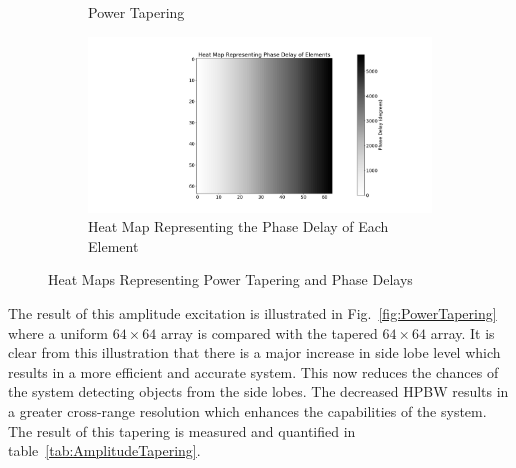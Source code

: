 \documentclass[11pt]{witseiepaper}
\begin{document}
\begin{bibunit}[witseie]
\begin{figure}[htb]
\begin{subfigure}{.5\textwidth}
            \caption{Power Tapering}
            \label{fig:PowerTaperingHeatMap}
        \end{subfigure}%
        \begin{subfigure}{.5\textwidth}
            \centering
            \includegraphics[width=0.9\linewidth]{PhasingHeatMap.pdf}
            \caption{Heat Map Representing the Phase Delay of Each Element}
                \label{fig:PhasingHeatMap}
            \end{subfigure}
\caption{Heat Maps Representing Power Tapering and Phase Delays}
\label{fig:HeatMaps}
\end{figure}
The result of this amplitude excitation is illustrated in Fig.~\ref{fig:PowerTapering} where a uniform $64 \times 64$ array is compared with the tapered $64 \times 64$ array. It is clear from this illustration that there is a major increase in side lobe level which results in a more efficient and accurate system. This now reduces the chances of the system detecting objects from the side lobes. The decreased HPBW results in a greater cross-range resolution which enhances the capabilities of the system. The result of this tapering is measured and quantified in table~\ref{tab:AmplitudeTapering}.


\end{bibunit}
\end{document}
